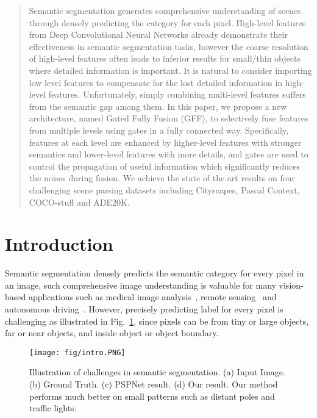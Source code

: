\documentclass[letterpaper]{article} \usepackage{aaai20}  \usepackage{times}  \usepackage{helvet} \usepackage{courier}  \usepackage[hyphens]{url}  \usepackage{graphicx} \urlstyle{rm} \def\UrlFont{\rm}  \usepackage{graphicx}  \usepackage{amsmath}
\author{Xiangtai Li\textsuperscript{\rm 1}, Houlong Zhao\textsuperscript{\rm 2}, Lei Han\textsuperscript{\rm 3}, Yunhai Tong\textsuperscript{\rm 1}, Shaohua Tan\textsuperscript{\rm 1}, Kuiyuan Yang\textsuperscript{\rm 2}\\
\textsuperscript{\rm 1}School of EECS, Peking University
\textsuperscript{\rm 2}DeepMotion 
\textsuperscript{\rm 3}Tecent AI lab
\\
\{lxtpku, yhtong\}@pku.edu.cn, tan@cis.pku.edu.cn \\
\{houlongzhao, kuiyuanyang\}@deepmotion.ai \\
leihan.cs@gmail.com
}
\begin{document}
\maketitle

\begin{abstract}
Semantic segmentation generates comprehensive understanding of scenes through densely predicting the category for each pixel. High-level features from Deep Convolutional Neural Networks already demonstrate their effectiveness in semantic segmentation tasks, however the coarse resolution of high-level features often leads to inferior results for small/thin objects where detailed information is important. It is natural to consider importing low level features to compensate for the lost detailed information in high-level features.
Unfortunately, simply combining multi-level features suffers from the semantic gap among them. In this paper, we propose a new architecture, named Gated Fully Fusion (GFF), to selectively fuse features from multiple levels using gates in a fully connected way. Specifically, features at each level are enhanced by higher-level features with stronger semantics and lower-level features with more details, and gates are used to control the propagation of useful information which significantly reduces the noises during fusion. We achieve the state of the art results on four challenging scene parsing datasets including Cityscapes, Pascal Context, COCO-stuff and ADE20K.
\end{abstract}

 
\section{Introduction}
\label{section:intro}
Semantic segmentation densely predicts the semantic category for every pixel in an image, such comprehensive image understanding is valuable for many vision-based applications such as medical image analysis~\cite{unet}, remote sensing~\cite{kampffmeyer2016semantic} and autonomous driving~\cite{xu2017end}. However, precisely predicting label for every pixel is challenging as illustrated in Fig.~\ref{fig:intro}, since pixels can be from tiny or large objects, far or near objects, and inside object or object boundary.


\begin{figure}
\centering
\texttt{[image: fig/intro.PNG]}
\caption{Illustration of challenges in semantic segmentation.
(a) Input Image. 
(b) Ground Truth. 
(c) PSPNet result. 
(d) Our result. Our method performs much better on small patterns such as distant poles and traffic lights.}
\label{fig:intro}
\end{figure}
\end{document}
